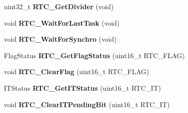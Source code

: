 \begin{DoxyCompactItemize}
\item 
\hypertarget{group__RTC__Exported__Functions_gaa4f00e0469fedcf6cbf23760e6d801ed}{
uint32\_\-t {\bfseries RTC\_\-GetDivider} (void)}
\label{group__RTC__Exported__Functions_gaa4f00e0469fedcf6cbf23760e6d801ed}

\item 
\hypertarget{group__RTC__Exported__Functions_gaa0a406ef860d5231748c5f0d82673036}{
void {\bfseries RTC\_\-WaitForLastTask} (void)}
\label{group__RTC__Exported__Functions_gaa0a406ef860d5231748c5f0d82673036}

\item 
\hypertarget{group__RTC__Exported__Functions_gaca4346e0dc15dccc15179786b28450db}{
void {\bfseries RTC\_\-WaitForSynchro} (void)}
\label{group__RTC__Exported__Functions_gaca4346e0dc15dccc15179786b28450db}

\item 
\hypertarget{group__RTC__Exported__Functions_ga21a85e5f846cb4552d5e76420779f3f6}{
FlagStatus {\bfseries RTC\_\-GetFlagStatus} (uint16\_\-t RTC\_\-FLAG)}
\label{group__RTC__Exported__Functions_ga21a85e5f846cb4552d5e76420779f3f6}

\item 
\hypertarget{group__RTC__Exported__Functions_gacefb05730a77ffaa273c1ac3ade1a22f}{
void {\bfseries RTC\_\-ClearFlag} (uint16\_\-t RTC\_\-FLAG)}
\label{group__RTC__Exported__Functions_gacefb05730a77ffaa273c1ac3ade1a22f}

\item 
\hypertarget{group__RTC__Exported__Functions_ga23274ad8aa28e86d5b0d58eee295db21}{
ITStatus {\bfseries RTC\_\-GetITStatus} (uint16\_\-t RTC\_\-IT)}
\label{group__RTC__Exported__Functions_ga23274ad8aa28e86d5b0d58eee295db21}

\item 
\hypertarget{group__RTC__Exported__Functions_ga62b9a04d89a11f28db7dcfd50d9ee768}{
void {\bfseries RTC\_\-ClearITPendingBit} (uint16\_\-t RTC\_\-IT)}
\label{group__RTC__Exported__Functions_ga62b9a04d89a11f28db7dcfd50d9ee768}

\end{DoxyCompactItemize}

